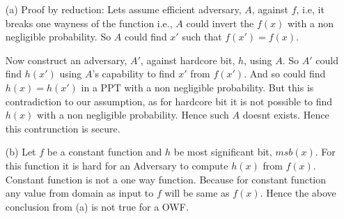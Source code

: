 \begin{itemize}
    \item [(a)] Proof by reduction:
Lets assume efficient adversary, $A$, against $f$, i.e, it breaks one wayness of
the function i.e., $A$ could invert the $f(x)$ with a non negligible probability.
So $A$ could find $x'$ such that $f(x') = f(x)$.


Now construct an adversary, $A'$, against hardcore bit, $h$, using $A$. So $A'$
could find $h(x')$ using $A$'s capability to find $x'$ from $f(x')$. And so could find $h(x)= h(x')$ 
in a PPT with a non negligible probability. But this is contradiction to our assumption,
as for hardcore bit it is not possible to find $h(x)$ with a 
non negligible probability. Hence such $A$ doesnt exists. Hence this contrunction is secure.

    \item [(b)] Let $f$ be a constant function and $h$ be most significant bit, $msb(x)$.
  For this function it is hard for an Adversary to compute $h(x)$ from $f(x)$.
  Constant function is not a one way function. Because for constant function any value from domain
  as input to $f$ will be same as $f(x)$. Hence the above conclusion from (a) is not true 
  for a OWF.
\end{itemize}